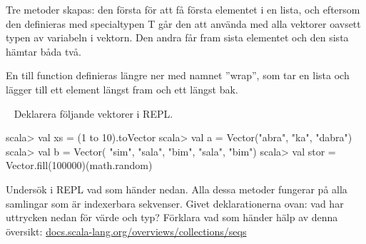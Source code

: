 \SubtaskSolved
Tre metoder skapas: den första för att få första elementet i en lista, och eftersom den definieras med specialtypen T går den att använda med alla vektorer oavsett typen av variabeln i vektorn. Den andra får fram sista elementet och den sista hämtar båda två.

En till function definieras längre ner med  namnet ''wrap'', som tar en lista och lägger till ett element längst fram och ett längst bak.


\QUESTEND









\QUESTBEGIN

\Task  \what~  Deklarera följande vektorer i REPL.
\begin{REPL}
scala> val xs = (1 to 10).toVector
scala> val a = Vector("abra", "ka", "dabra")
scala> val b = Vector( "sim", "sala", "bim", "sala", "bim")
scala> val stor = Vector.fill(100000)(math.random)
\end{REPL}
Undersök i REPL vad som händer nedan. Alla dessa metoder fungerar på alla samlingar som är indexerbara sekvenser. Givet deklarationerna ovan: vad har uttrycken nedan för värde och typ? Förklara vad som händer hälp av denna  översikt: \href{http://docs.scala-lang.org/overviews/collections/seqs}{docs.scala-lang.org/overviews/collections/seqs}

\Subtask {}

\Subtask {}

\Subtask {}

\Subtask {}

\Subtask {}

\Subtask {}

\Subtask {}

\Subtask {}

\Subtask {}

\Subtask {}

\Subtask {}

\Subtask {}

\Subtask {}

\Subtask {}


